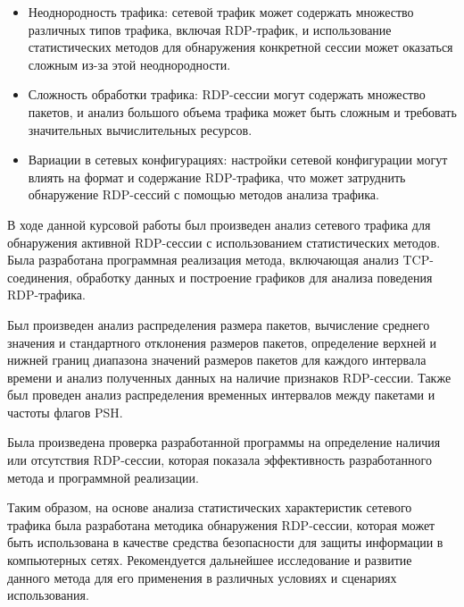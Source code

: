 \documentclass[bachelor, och, coursework]{SCWorks}
\begin{document}
\begin{itemize}
  \item Неоднородность трафика: сетевой трафик может содержать множество различных типов трафика, включая RDP-трафик, и использование статистических 
  методов для обнаружения конкретной сессии может оказаться сложным из-за этой неоднородности.
  \item Сложность обработки трафика: RDP-сессии могут содержать множество пакетов, и анализ большого объема трафика может быть сложным и требовать 
  значительных вычислительных ресурсов.
  \item Вариации в сетевых конфигурациях: настройки сетевой конфигурации могут влиять на формат и содержание RDP-трафика, что может затруднить 
  обнаружение RDP-сессий с помощью методов анализа трафика.
\end{itemize}

\conclusion
  
В ходе данной курсовой работы был произведен анализ сетевого трафика для обнаружения активной RDP-сессии с использованием статистических методов. 
Была разработана программная реализация метода, включающая анализ TCP-соединения, обработку данных и построение графиков для анализа поведения 
RDP-трафика. 

Был произведен анализ распределения размера пакетов, вычисление среднего значения и стандартного отклонения размеров пакетов, определение 
верхней и нижней границ диапазона значений размеров пакетов для каждого интервала времени и анализ полученных данных на наличие признаков 
RDP-сессии. Также был проведен анализ распределения временных интервалов между пакетами и частоты флагов PSH.

Была произведена проверка разработанной программы на определение наличия или отсутствия RDP-сессии, которая показала эффективность 
разработанного метода и программной реализации.

Таким образом, на основе анализа статистических характеристик сетевого трафика была разработана методика обнаружения RDP-сессии, 
которая может быть использована в качестве средства безопасности для защиты информации в компьютерных сетях. 
Рекомендуется дальнейшее исследование и развитие данного метода для его применения в различных условиях и сценариях использования.
\end{document}
